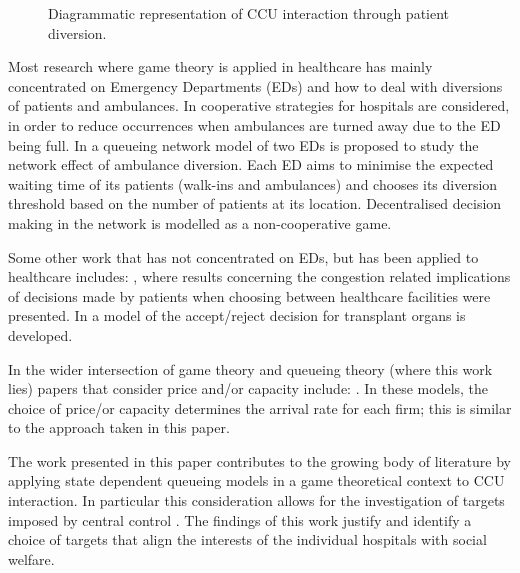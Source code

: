 \documentclass{article}
\begin{document}
\begin{figure}[!htbp]
\begin{center}
\caption{Diagrammatic representation of CCU interaction through patient diversion.}\label{diagramofdiversion}
\end{center}
\end{figure}

Most research where game theory is applied in healthcare has mainly concentrated on Emergency Departments (EDs) and how to deal with diversions of patients and ambulances.
In \cite{Hagtvedt2009} cooperative strategies for hospitals are considered, in order to reduce occurrences when ambulances are turned away due to the ED being full.
In \cite{Deo2011} a queueing network model of two EDs is proposed to study the network effect of ambulance diversion.
Each ED aims to minimise the expected waiting time of its patients (walk-ins and ambulances) and chooses its diversion threshold based on the number of patients at its location. Decentralised decision making in the network is modelled as a non-cooperative game.

Some other work that has not concentrated on EDs, but has been applied to healthcare includes: \cite{Knight2013}, where results concerning the congestion related implications of decisions made by patients when choosing between healthcare facilities were presented. In \cite{Howard2002} a model of the accept/reject decision for transplant organs is developed.

In the wider intersection of game theory and queueing theory (where this work lies) papers that consider price and/or capacity include: \cite{Allon2007, Cachon2002,  Cachon2007, Kalai1992, Levhari1978}. In these models, the choice of price/or capacity determines the arrival rate for each firm; this is similar to the approach taken in this paper.

The work presented in this paper contributes to the growing body of literature by applying state dependent queueing models in a game theoretical context to CCU interaction.
In particular this consideration allows for the investigation of targets imposed by central control \cite{Bevan2006}.
The findings of this work justify and identify a choice of targets that align the interests of the individual hospitals with social welfare.
\end{document}
